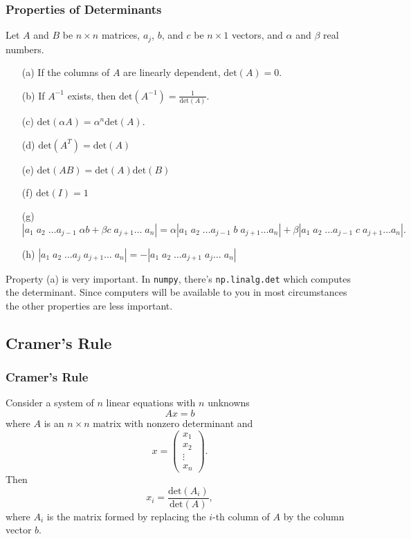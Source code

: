 \documentclass{beamer}
\begin{document}
\begin{frame}
\frametitle{Properties of Determinants} 
{\tiny
Let $A$ and $B$ be $n\times n$ matrices, $a_j$, $b$, and $c$ be $n\times 1$ vectors, and $\alpha$ and $\beta$ real numbers.
\begin{enumerate}
\item[(a)] If the columns of $A$ are linearly dependent, $\text{det}(A) = 0$.
\item[(b)] If $A^{-1}$ exists, then $\text{det}(A^{-1}) = \frac{1}{\text{det}(A)}$.
\item[(c)] $\text{det}(\alpha A) = \alpha^n \text{det}(A)$.
\item[(d)] $\text{det}(A^T) = \text{det}(A)$
\item[(e)] $\text{det}(AB) = \text{det}(A)\text{det}(B)$
\item[(f)]  $\text{det}(I) = 1$

\item[(g)] $
\left| a_1\;	a_2\; \ldots a_{j - 1}\;	\alpha b  + \beta c\; a_{j + 1}  \ldots\;  a_n\right| = \alpha \left| a_1\; a_2\; \ldots a_{j - 1}\; b\; a_{j + 1} \ldots  a_n\right| + \beta \left| a_1\; a_2\;	 \ldots a_{j-1}\; c \; a_{j + 1} \ldots a_n\right|.
$
\item[(h)] $
\left| a_1\;	a_2\; \ldots a_{j }\;	a_{j + 1}   \ldots\;  a_n\right|  = -\left| a_1\;	a_2\; \ldots a_{j + 1}\;	a_{j}   \ldots\;  a_n\right| 
$
\end{enumerate}
Property (a) is very important. In \texttt{numpy}, there's \texttt{np.linalg.det} which computes the determinant. Since computers will be available to you in most circumstances the other properties are less important.}
\end{frame}

\subsection{Cramer's Rule}

\begin{frame}
\frametitle{Cramer's Rule}
\small
Consider a system of $n$ linear equations with $n$ unknowns
$$
 A x = b
$$
where $A$ is an $n\times n$ matrix with nonzero determinant and 
$$
x = \left(\begin{array}{c} x_1\\ x_2\\ \vdots\\ x_n\end{array}\right).
$$
Then 
$$
x_i = \frac{\text{det}(A_i)}{\text{det}(A)},
$$
where $A_i$ is the matrix formed by replacing the $i$-th column of $A$ by the column vector $b$.
\end{frame}
\end{document}
